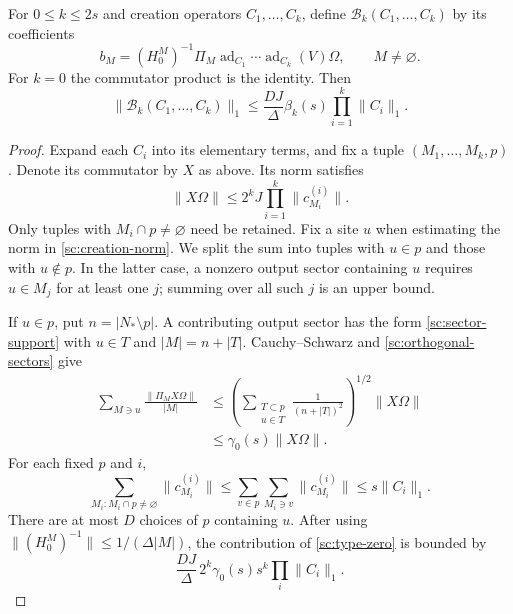 \begin{lemma}
\label{sc:sector-estimate}
For $0\le k\le2s$ and creation operators $C_1,\ldots,C_k$, define
$\mathcal B_k(C_1,\ldots,C_k)$ by its coefficients
\begin{equation}
 b_M=(H_0^M)^{-1}\Pi_M
       \operatorname{ad}_{C_1}\cdots\operatorname{ad}_{C_k}(V)\Omega,
 \qquad M\ne\varnothing.
 \label{sc:Bk}
\end{equation}
For $k=0$ the commutator product is the identity. Then
\begin{equation}
 \|\mathcal B_k(C_1,\ldots,C_k)\|_1
 \le\frac{DJ}{\Delta}\beta_k(s)
                      \prod_{i=1}^k\|C_i\|_1.
 \label{sc:multilinear}
\end{equation}
\end{lemma}
\begin{proof}
Expand each $C_i$ into its elementary terms, and fix a tuple
$(M_1,\ldots,M_k,p)$. Denote its commutator by $X$ as above. Its norm
satisfies
\begin{equation}
 \|X\Omega\|\le2^kJ\prod_{i=1}^k\|c^{(i)}_{M_i}\|.
 \label{sc:tuple-norm}
\end{equation}
Only tuples with $M_i\cap p\ne\varnothing$ need be retained.
Fix a site $u$ when estimating the norm in
\eqref{sc:creation-norm}. We split the sum into tuples with $u\in p$
and those with $u\notin p$. In the latter case, a nonzero output
sector containing $u$ requires $u\in M_j$ for at least one $j$;
summing over all such $j$ is an upper bound.

If $u\in p$, put $n=|N_*\setminus p|$. A contributing output
sector has the form \eqref{sc:sector-support} with $u\in T$ and
$|M|=n+|T|$. Cauchy--Schwarz and
\eqref{sc:orthogonal-sectors} give
\begin{align}
 \sum_{M\ni u}\frac{\|\Pi_MX\Omega\|}{|M|}
 &\le\left(\sum_{\substack{T\subset p\\u\in T}}
                     \frac{1}{(n+|T|)^2}\right)^{1/2}\|X\Omega\|
 \nonumber\\
 &\le\gamma_0(s)\|X\Omega\|.
 \label{sc:type-zero}
\end{align}
For each fixed $p$ and $i$,
\begin{equation}
 \sum_{M_i:M_i\cap p\ne\varnothing}\|c^{(i)}_{M_i}\|
 \le\sum_{v\in p}\sum_{M_i\ni v}\|c^{(i)}_{M_i}\|
 \le s\|C_i\|_1.
 \label{sc:incidence-sum}
\end{equation}
There are at most $D$ choices of $p$ containing $u$. After using
$\|(H_0^M)^{-1}\|\le1/(\Delta|M|)$, the contribution of
\eqref{sc:type-zero} is bounded by
\[
 \frac{DJ}{\Delta}\,2^k\gamma_0(s)s^k
                     \prod_i\|C_i\|_1.
\]


\end{proof}
